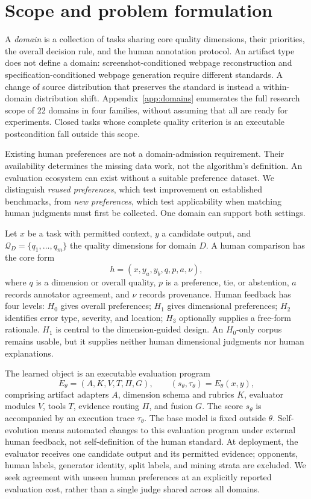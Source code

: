 \section{Scope and problem formulation}
\label{sec:problem}

A \emph{domain} is a collection of tasks sharing core quality dimensions, their
priorities, the overall decision rule, and the human annotation protocol.
An artifact type does not define a domain: screenshot-conditioned webpage
reconstruction and specification-conditioned webpage generation require
different standards. A change of source distribution that preserves the standard
is instead a within-domain distribution shift. Appendix~\ref{app:domains}
enumerates the full research scope of 22 domains in four families, without
assuming that all are ready for experiments. Closed tasks whose complete quality
criterion is an executable postcondition fall outside this scope.

Existing human preferences are not a domain-admission requirement. Their
availability determines the missing data work, not the algorithm's definition.
An evaluation ecosystem can exist without a suitable preference dataset.
We distinguish \emph{reused preferences}, which test improvement on established
benchmarks, from \emph{new preferences}, which test applicability when matching
human judgments must first be collected. One domain can support both settings.

Let $x$ be a task with permitted context, $y$ a candidate output, and
$\mathcal{Q}_D=\{q_1,\ldots,q_m\}$ the quality dimensions for domain $D$.
A human comparison has the core form
\begin{equation}
 h=(x,y_a,y_b,q,p,a,\nu),
 \label{eq:human}
\end{equation}
where $q$ is a dimension or overall quality, $p$ is a preference, tie, or abstention, $a$ records annotator agreement, and $\nu$ records provenance.
Human feedback has four levels: $H_0$ gives overall preferences; $H_1$ gives dimensional preferences; $H_2$ identifies error type, severity, and location; $H_3$ optionally supplies a free-form rationale.
$H_1$ is central to the dimension-guided design.
An $H_0$-only corpus remains usable, but it supplies neither human dimensional judgments nor human explanations.

The learned object is an executable evaluation program
\begin{equation}
 E_\theta=(A,K,V,T,\Pi,G),\qquad (s_\theta,\tau_\theta)=E_\theta(x,y),
 \label{eq:program}
\end{equation}
comprising artifact adapters $A$, dimension schema and rubrics $K$, evaluator
modules $V$, tools $T$, evidence routing $\Pi$, and fusion $G$.
The score $s_\theta$ is accompanied by an execution trace $\tau_\theta$.
The base model is fixed outside $\theta$.
Self-evolution means automated changes to this evaluation program under external human feedback, not self-definition of the human standard.
At deployment, the evaluator receives one candidate output and its permitted evidence; opponents, human labels, generator identity, split labels, and mining strata are excluded.
We seek agreement with unseen human preferences at an explicitly reported evaluation cost, rather than a single judge shared across all domains.
